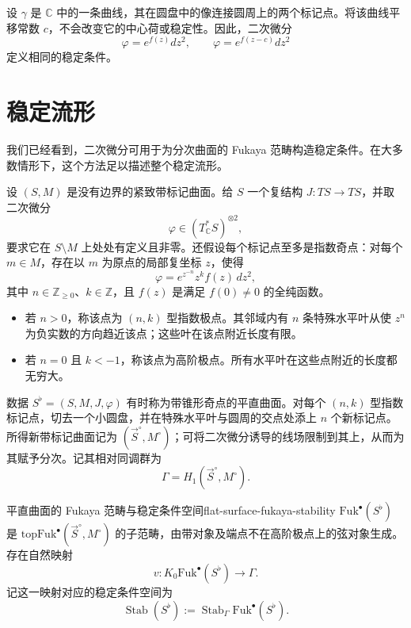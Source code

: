 \begin{note}[平移对稳定条件的影响]
设 $\gamma$ 是 $\mathbb C$ 中的一条曲线，其在圆盘中的像连接圆周上的两个标记点。将该曲线平移常数 $c$，不会改变它的中心荷或稳定性。因此，二次微分
\[
  \varphi=e^{f(z)}dz^2,\qquad \varphi=e^{f(z-c)}dz^2
\]
定义相同的稳定条件。
\end{note}


\section{稳定流形}\label{sec:stability-manifolds}

我们已经看到，二次微分可用于为分次曲面的 Fukaya 范畴构造稳定条件。在大多数情形下，这个方法足以描述整个稳定流形。

设 $(S,M)$ 是没有边界的紧致带标记曲面。给 $S$ 一个复结构 $J\colon TS\to TS$，并取二次微分
\[
  \varphi\in(T^*_{\mathbb C}S)^{\otimes2},
\]
要求它在 $S\setminus M$ 上处处有定义且非零。还假设每个标记点至多是指数奇点：对每个 $m\in M$，存在以 $m$ 为原点的局部复坐标 $z$，使得
\[
  \varphi=e^{z^{-n}}z^kf(z)\,dz^2,
\]
其中 $n\in\mathbb Z_{\ge0}$、$k\in\mathbb Z$，且 $f(z)$ 是满足 $f(0)\ne0$ 的全纯函数。
\begin{itemize}
  \item 若 $n>0$，称该点为 $(n,k)$ 型指数极点。其邻域内有 $n$ 条特殊水平叶从使 $z^n$ 为负实数的方向趋近该点；这些叶在该点附近长度有限。
  \item 若 $n=0$ 且 $k<-1$，称该点为高阶极点。所有水平叶在这些点附近的长度都无穷大。
\end{itemize}
数据 $S^{\flat}=(S,M,J,\varphi)$ 有时称为带锥形奇点的平直曲面。对每个 $(n,k)$ 型指数标记点，切去一个小圆盘，并在特殊水平叶与圆周的交点处添上 $n$ 个新标记点。所得新带标记曲面记为 $(\vec S^{\circ},M^{\circ})$；可将二次微分诱导的线场限制到其上，从而为其赋予分次。记其相对同调群为
\[
  \Gamma=H_1(\vec S^{\circ},M^{\circ}).
\]

\begin{definition}{平直曲面的 Fukaya 范畴与稳定条件空间}{flat-surface-fukaya-stability}
$\mathrm{Fuk}^{\bullet}(S^{\flat})$ 是 $\mathrm{topFuk}^{\bullet}(\vec S^{\circ},M^{\circ})$ 的子范畴，由带对象及端点不在高阶极点上的弦对象生成。存在自然映射
\[
  v\colon K_0\mathrm{Fuk}^{\bullet}(S^{\flat})\longrightarrow\Gamma.
\]
记这一映射对应的稳定条件空间为
\[
  \operatorname{Stab}(S^{\flat})
  :=\operatorname{Stab}_{\Gamma}\mathrm{Fuk}^{\bullet}(S^{\flat}).
\]
\end{definition}

